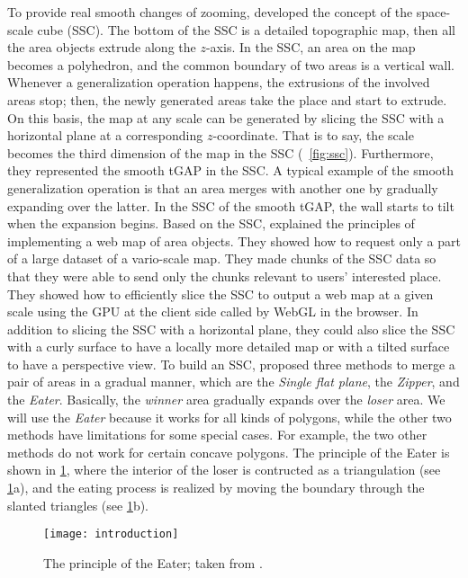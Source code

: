 \documentclass[twocolumn]{svjour3}          %
\begin{document}
To provide real smooth changes of zooming, \citet{vanOosterom2014Support}
developed the concept of the space-scale cube (SSC).
The bottom of the SSC is a detailed topographic map,
then all the area objects extrude along the $z$-axis.
In the SSC, an area on the map becomes a polyhedron, and
the common boundary of two areas is a vertical wall.
Whenever a generalization operation happens, 
the extrusions of the involved areas stop;
then, the newly generated areas take the place and start to extrude.
On this basis, the map at any scale can be generated by slicing the SSC 
with a horizontal plane at a corresponding $z$-coordinate.
That is to say, the scale becomes the third dimension of the map in the SSC
(\eg~\fig\ref{fig:ssc}).
Furthermore, they represented the smooth tGAP in the SSC.
A typical example of the smooth generalization operation is that 
an area merges with another one by gradually expanding over the latter.
In the SSC of the smooth tGAP, 
the wall starts to tilt when the expansion begins.
Based on the SSC, \citet{Meijers2020Web} explained the principles of 
implementing a web map of area objects.
They showed how to request only a part of a large dataset of a vario-scale map.
They made chunks of the SSC data
so that they were able to send only the chunks relevant 
to users' interested place.
They showed how to efficiently slice the SSC 
to output a web map at a given scale 
using the GPU at the client side called by WebGL in the browser.
In addition to slicing the SSC with a horizontal plane,
they could also slice the SSC with a curly surface 
to have a locally more detailed map
or with a tilted surface to have a perspective view.
To build an SSC, \citet{Suba2014Merge} proposed three methods 
to merge a pair of areas in a gradual manner, 
which are the \emph{Single flat plane}, 
the \emph{Zipper}, and the \emph{Eater}.
Basically, the \emph{winner} area gradually expands over the \emph{loser} area.
We will use the \emph{Eater} because it works for all kinds of polygons,
while the other two methods have limitations for some special cases.
For example, the two other methods do not work for certain concave polygons.
The principle of the Eater is shown in \fig\ref{fig:eater},
where the interior of the loser is contructed as a triangulation 
(see \fig\ref{fig:eater}a),
and the eating process is realized by moving the boundary
through the slanted triangles (see \fig\ref{fig:eater}b).

\begin{figure}[tb]
\centering
\texttt{[image: introduction]}
\caption{The principle of the Eater;
taken from \citet{Suba2014Merge}.}
\label{fig:eater}
\end{figure}
\end{document}
